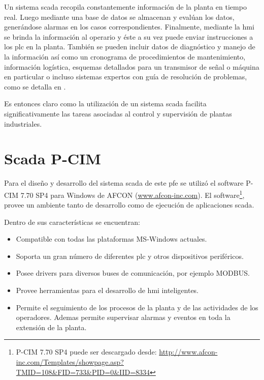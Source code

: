 Un sistema \gls{scada} recopila constantemente información de la planta en 
tiempo real. Luego mediante una base de datos se almacenan y evalúan los datos, 
generándose alarmas en los casos correspondientes. Finalmente, mediante
la \gls{hmi} se brinda la información al operario y éste a su vez puede enviar
instrucciones a los \gls{plc} en la planta. También se pueden incluir datos de 
diagnóstico y manejo de la información así como un cronograma de procedimientos 
de mantenimiento, información logística, esquemas detallados para un transmisor de señal o 
máquina en particular o incluso sistemas expertos con guía de resolución de 
problemas, como se detalla en \cite{bib:ManualScada}.

Es entonces claro como la utilización de un sistema \gls{scada} facilita 
significativamente las tareas asociadas al control y supervisión de plantas
industriales.

\section{Scada P-CIM}
\label{sec:ScadaPCIM} 
Para el diseño y desarrollo del sistema \gls{scada} de este \gls{pfe} se 
utilizó el software P-CIM 7.70 SP4 para Windows de AFCON 
(\url{www.afcon-inc.com}). El software\footnote{P-CIM 7.70 SP4 puede
ser descargado desde:
\url{
http://www.afcon-inc.com/Templates/showpage.asp?TMID=108&FID=733&PID=0&IID=8334}
}, provee un ambiente tanto de desarrollo
como de ejecución de aplicaciones \gls{scada}.

Dentro de sus características se encuentran:
\begin{itemize}
 \item Compatible con todas las plataformas MS-Windows actuales.
 \item Soporta un gran número de diferentes \gls{plc} y otros dispositivos 
  periféricos.
 \item Posee drivers para diversos buses de comunicación, por ejemplo MODBUS.
 \item Provee herramientas para el desarrollo de \gls{hmi} inteligentes.
 \item Permite el seguimiento de los procesos de la planta y de las actividades
  de los operadores. Ademas permite supervisar alarmas y eventos en toda la
  extensión de la planta.
\end{itemize}

